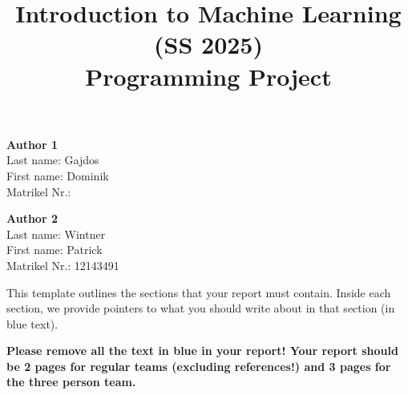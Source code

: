 \documentclass[a4, 10 pt, conference]{ieeeconf}  %
\title{\LARGE \bf
Introduction to Machine Learning (SS 2025)\\ Programming Project
\vspace{-3em}
}
\begin{document}
\maketitle
\vspace{-3em}
\thispagestyle{empty}
\pagestyle{empty}

\begin{strip}
\begin{tcolorbox}[
size=tight,
colback=white,
boxrule=0.2mm,
left=3mm,right=3mm, top=3mm, bottom=1mm
]
{\begin{multicols}{2}%

\textbf{Author 1}\\
Last name: Gajdos\\
First name: Dominik\\
Matrikel Nr.:\\  %

\columnbreak

\textbf{Author 2}\\
Last name: Wintner\\
First name: Patrick\\
Matrikel Nr.: 12143491\\

\columnbreak


\end{multicols}}
\end{tcolorbox}
\end{strip}



{\color{blue}
  \noindent This template outlines the sections that your report must 
  contain. Inside each section, we provide pointers to what you should
  write about in that section (in blue text).  \linebreak

\noindent \textbf{Please remove all the text in blue in your report!
  Your report should be 2 pages for regular teams (excluding references!)
  and 3 pages for the three person team.}  }
\end{document}
